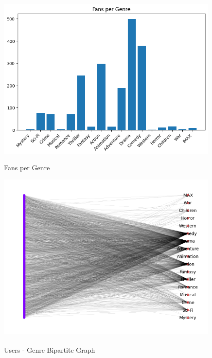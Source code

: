 \documentclass[12pt]{article}
\numberwithin{equation}{section}
\begin{document}
\begin{figure}[h!]
\label{fig:fanspergenre}
    \begin{minipage}[b]{0.49\linewidth}
         \centering
  	\includegraphics[width=0.99\textwidth]{fans_per_genre.png}
	 \caption{Fans per Genre}
    \end{minipage}
    \hspace{0.01 cm}
    \begin{minipage}[b]{0.49\linewidth}
         \centering
  	\includegraphics[width=0.99\textwidth]{genre_bipartite.png}
  	\caption{\\Users - Genre Bipartite Graph}
\label{fig:genre_bipartite}
    \end{minipage}
\end{figure}
\end{document}
